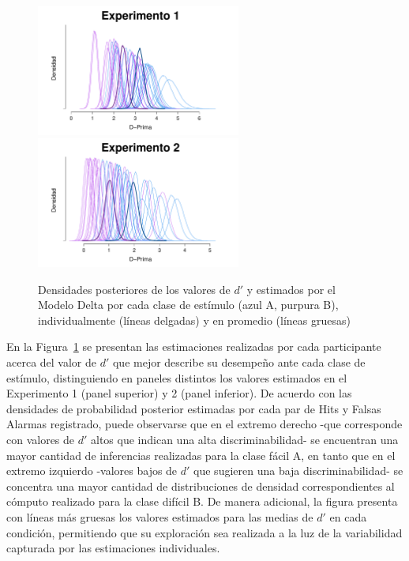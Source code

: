\begin{figure}[th]
\centering
\includegraphics[width=0.6\textwidth]{Figures/MDelta_Dprima_E1}\\
\includegraphics[width=0.6\textwidth]{Figures/MDelta_Dprima_E2}\\
\caption[Modelo Delta: Densidades posteriores de los valores de $d'$ estimados individualmente y en promedio, por experimento]{Densidades posteriores de los valores de $d'$ y estimados por el Modelo Delta por cada clase de estímulo (azul A, purpura B), individualmente (líneas delgadas) y en promedio (líneas gruesas)}
\label{fig:Delta_Dprima}
\end{figure}

En la Figura~\ref{fig:Delta_Dprima} se presentan las estimaciones realizadas por cada participante acerca del valor de $d'$ que mejor describe su desempeño ante cada clase de estímulo, distinguiendo en paneles distintos los valores estimados en el Experimento 1 (panel superior) y 2 (panel inferior). De acuerdo con las densidades de probabilidad posterior estimadas por cada par de Hits y Falsas Alarmas registrado, puede observarse que en el extremo derecho -que corresponde con valores de $d'$ altos que indican una alta discriminabilidad- se encuentran una mayor cantidad de inferencias realizadas para la clase fácil A, en tanto que en el extremo izquierdo -valores bajos de $d'$ que sugieren una baja discriminabilidad- se concentra una mayor cantidad de distribuciones de densidad correspondientes al cómputo realizado para la clase difícil B. De manera adicional, la figura presenta con líneas más gruesas los valores estimados para las medias de $d'$ en cada condición, permitiendo que su exploración sea realizada a la luz de la variabilidad capturada por las estimaciones individuales.\\

